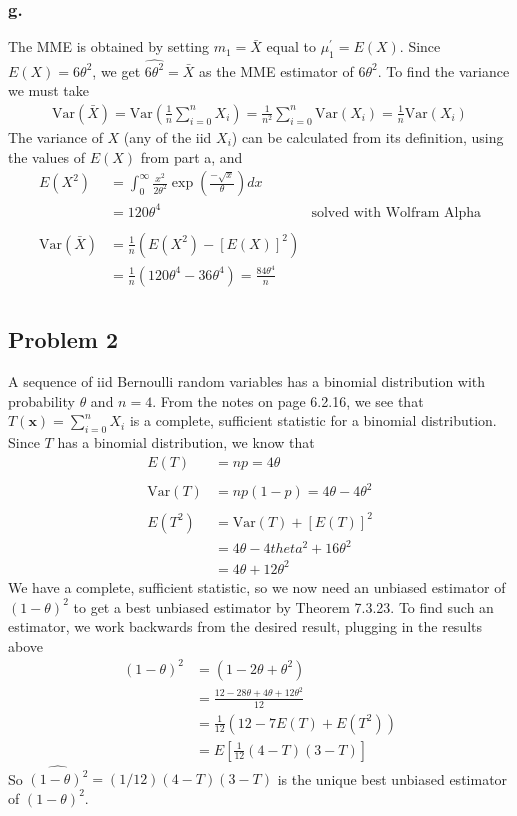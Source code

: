 \documentclass{article}
\begin{document}
\subsubsection*{g.}
The MME is obtained by setting $m_1=\bar{X}$ equal to $\mu_1^\prime = E(X)$. Since $E(X) = 6\theta^2$, we get $\widehat{6\theta^2} = \bar{X}$ as the MME estimator of $6\theta^2$. To find the variance we must take 
\begin{align*}
\mathrm{Var}(\bar{X}) = \mathrm{Var}\left(\frac{1}{n}\sum_{i=0}^n X_i\right) = \frac{1}{n^2}\sum_{i=0}^n \mathrm{Var}(X_i) = \frac{1}{n}\mathrm{Var}(X_i)
\end{align*}
The variance of $X$ (any of the iid $X_i$) can be calculated from its definition, using the values of $E(X)$ from part a, and
\begin{align*}
E(X^2) &= \int_0^\infty \frac{x^2}{2\theta^2}\exp\left(\frac{-\sqrt{x}}{\theta}\right)dx \\
&=120\theta^4 &\text{solved with Wolfram Alpha}\\ \\
\mathrm{Var}(\bar{X}) &= \frac{1}{n}\left(E(X^2) - \left[E(X)\right]^2\right) \\
&=\frac{1}{n}\left(120\theta^4-36\theta^4\right) = \frac{84\theta^4}{n} \\
\end{align*}

\subsection*{Problem 2}
A sequence of iid Bernoulli random variables has a binomial distribution with probability $\theta$ and $n=4$. From the notes on page 6.2.16, we see that $T(\mathbf{x}) = \sum_{i=0}^n X_i$ is a complete, sufficient statistic for a binomial distribution. Since $T$ has a binomial distribution, we know that 
\begin{align*}
E(T) &= np = 4\theta \\ \\
\mathrm{Var}(T) &= np(1-p) = 4\theta - 4 \theta^2 \\ \\
E(T^2) &= \mathrm{Var}(T) + \left[E(T)\right]^2\\
&=4\theta-4theta^2 + 16\theta^2 \\
&=4\theta + 12\theta^2
\end{align*}
We have a complete, sufficient statistic, so we now need an unbiased estimator of $(1-\theta)^2$ to get a best unbiased estimator by Theorem 7.3.23. To find such an estimator, we work backwards from the desired result, plugging in the results above
\begin{align*}
(1-\theta)^2 &= (1-2\theta+\theta^2) \\
&=\frac{12-28\theta+4\theta+12\theta^2}{12} \\
&=\frac{1}{12}\left(12-7E(T)+E(T^2)\right) \\
&=E\left[\frac{1}{12}(4-T)(3-T)\right]
\end{align*}
So $\widehat{(1-\theta)^2} = (1/12)(4-T)(3-T)$ is the unique best unbiased estimator of $(1-\theta)^2$.
\end{document}
